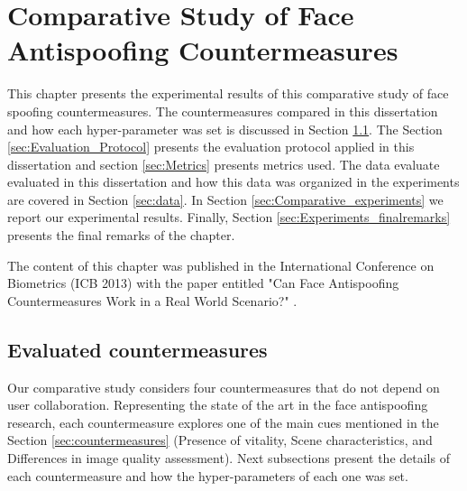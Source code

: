 \chapter{Comparative Study of Face Antispoofing Countermeasures}
\label{chap:Comparative_Study}

This chapter presents the experimental results of this comparative study of face spoofing countermeasures. The countermeasures compared in this dissertation and how each hyper-parameter was set is discussed in Section \ref{sec:Evaluated_countermeasures}. The Section \ref{sec:Evaluation_Protocol} presents the evaluation protocol applied in this dissertation and section \ref{sec:Metrics} presents metrics used. The data evaluate evaluated in this dissertation and how this data was organized in the experiments are covered in Section \ref{sec:data}. In Section \ref{sec:Comparative_experiments} we report our experimental results. Finally, Section \ref{sec:Experiments_finalremarks} presents the final remarks of the chapter.

The content of this chapter was published in the International Conference on Biometrics (ICB 2013) with the paper entitled "Can Face Antispoofing Countermeasures Work in a Real World Scenario?" \cite{FreitasPereira_ICB_2013}.



\section{Evaluated countermeasures}
\label{sec:Evaluated_countermeasures}

Our comparative study considers four countermeasures that do not depend on user collaboration. Representing the state of the art in the face antispoofing research, each countermeasure explores one of the main cues mentioned in the Section \ref{sec:countermeasures} (Presence of vitality, Scene characteristics, and Differences in image quality assessment). Next subsections present the details of each countermeasure and how the hyper-parameters of each one was set.

